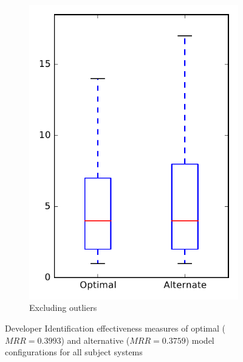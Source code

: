 \begin{figure}
\begin{subfigure}{.4\textwidth}
        \includegraphics[height=0.4\textheight]{figures/combo/dit_rq1_overview_no_outlier}
        \caption{Excluding outliers}\label{fig:combo:dit:rq1:overview_no_outlier}
    \end{subfigure}
\caption{Developer Identification effectiveness measures of optimal ($MRR=0.3993$) and alternative ($MRR=0.3759$) model configurations for all subject systems}
\label{fig:combo:dit:rq1:overview}
\end{figure}

